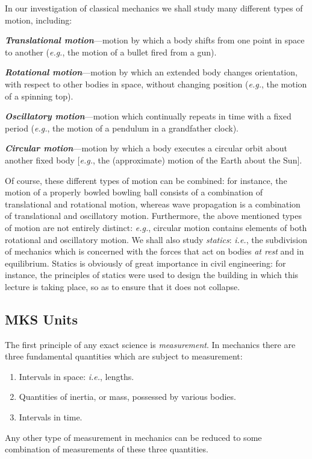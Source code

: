 In our investigation of classical mechanics we shall study many different types
of motion, including:
\begin{description}
\item {\bf\em Translational motion}---motion by which a body shifts from one point in space to
another ({\em e.g.}, the motion of a bullet fired from a gun).
\item {\bf\em Rotational motion}---motion by which an extended body changes orientation, with respect
to other bodies in space, without changing position ({\em e.g.}, the motion of a
spinning top).
\item {\bf\em Oscillatory motion}---motion which continually repeats in time with a fixed period
({\em e.g.}, the motion of a pendulum in a grandfather clock).
\item {\bf\em Circular motion}---motion by which a body executes a circular orbit about another
fixed body [{\em e.g.}, the (approximate) motion of the Earth about the Sun].
\end{description}
Of course, these different types of motion can be combined: for instance, the motion
of a properly bowled bowling ball  consists of a combination of translational and rotational
motion, whereas wave propagation is a combination of translational and oscillatory motion.
Furthermore, the above mentioned types of motion are not entirely
distinct: {\em e.g.}, circular motion contains elements of both rotational and oscillatory motion.
We shall also study {\em statics}: {\em i.e.}, the subdivision of mechanics
 which is concerned with the forces that
act on bodies {\em at rest} and  in equilibrium. Statics is obviously of great importance in civil
engineering: for instance, the principles of statics were used to design the building
in which this lecture is taking place, so as to ensure that it does not collapse.

\subsection{MKS Units}
The first principle of any exact science is {\em measurement}. In mechanics
there are three fundamental quantities which are subject to measurement: 
\begin{enumerate}
\item Intervals in space: {\em i.e.}, lengths.
\item Quantities of inertia, or mass, possessed by various bodies.
\item Intervals in time.
\end{enumerate}
Any other type of measurement in mechanics can be reduced to some combination of
measurements of these three quantities.

